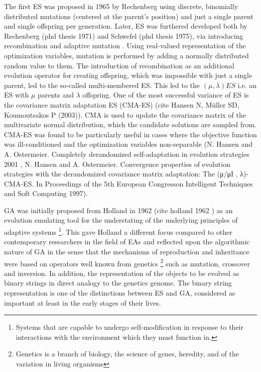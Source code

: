 The first ES was proposed in 1965 by Rechenberg using discrete, binomially distributed mutations (centered at the parent's position) and just a single parent and single offspring per generation. Later, ES was furthered developed both by Rechenberg (phd thesis 1971) and Schwefel (phd thesis 1975), via introducing recombination and adaptive mutation \cite{Rechenberg}. Using real-valued representation of the optimization variables, mutation is performed by adding a normally distributed random value to them. The introduction of recombination as an additional evolution operator for creating offspring, which was impossible with just a single parent, led to the so-called multi-membered ES. This led to the $(\mu, \lambda)ES$ i.e. an ES with $\mu$ parents and $\lambda$ offspring. One of the most successful variance of ES is the covariance matrix adaptation ES (CMA-ES) (cite Hansen N, Müller SD, Koumoutsakos P (2003)). CMA is used to update the covariance matrix of the multivariate normal distribution, which the candidate solutions are sampled from. CMA-ES was found to be particularly useful in cases where the objective function was ill-conditioned and the optimization variables non-separable (N. Hansen and A. Ostermeier. Completely derandomized self-adaptation in evolution strategies 2001 , N. Hansen and A. Ostermeier. Convergence properties of evolution strategies with the derandomized covariance matrix adaptation: The (μ/μI , λ)-CMA-ES. In Proceedings of the 5th European Congresson Intelligent Techniques and Soft Computing 1997).  

GA was initially proposed from Holland in 1962 (cite holland 1962 \cite{holland_1975}) as an evolution emulating tool for the understating of the underlying principles
of adaptive systems \footnote{Systems that are capable to undergo self-modification in response to their interactions with the environment which they must function in.}. This gave Holland a different focus compared to other contemporary researchers in the field of EAs and reflected upon the algorithmic nature of GA in the sense that the mechanisms of reproduction and inheritance were based on operators well known from genetics \footnote{Genetics is a branch of biology, the science of genes, heredity, and of the variation in living organisms} such as mutation, crossover and inversion. In addition, the representation of the objects to be evolved as binary strings in direct analogy to the genetics genome. The binary string representation is one of the distinctions between ES and GA, considered as important at least in the early stages of their lives.  
 
